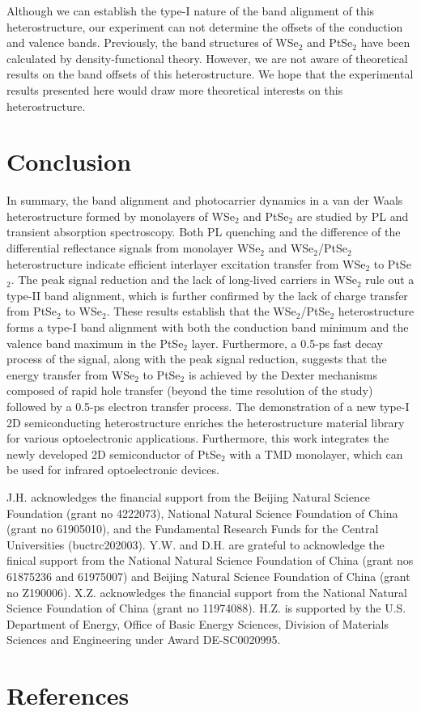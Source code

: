 \documentclass[10pt]{iopart}
\begin{document}
Although we can establish the type-I nature of the band alignment of this heterostructure, our experiment can not determine the offsets of the conduction and valence bands. Previously, the band structures of WSe$_2$ and PtSe$_2$ have been calculated by density-functional theory\cite{wang2015monolayer,zhao2017high,sattar2017electronic,li2016tuning,kim2021thickness}. However, we are not aware of theoretical results on the band offsets of this heterostructure. We hope that the experimental results presented here would draw more theoretical interests on this heterostructure.


 \section{Conclusion} 
 In summary, the band alignment and photocarrier dynamics in a van der Waals heterostructure formed by monolayers of WSe$_2$ and PtSe$_2$ are studied by PL and transient absorption spectroscopy. Both PL quenching and the difference of the differential reflectance signals from monolayer WSe$_2$ and WSe$_2$/PtSe$_2$ heterostructure indicate efficient interlayer excitation transfer from WSe$_2$ to PtSe$_2$. The peak signal reduction and the lack of long-lived carriers in WSe$_2$ rule out a type-II band alignment, which is further confirmed by the lack of charge transfer from PtSe$_2$ to WSe$_2$. These results establish that the WSe$_2$/PtSe$_2$ heterostructure forms a type-I band alignment with both the conduction band minimum and the valence band maximum in the PtSe$_2$ layer. Furthermore, a 0.5-ps fast decay process of the signal, along with the peak signal reduction, suggests that the energy transfer from WSe$_2$ to PtSe$_2$ is achieved by the Dexter mechanisms composed of rapid hole transfer (beyond the time resolution of the study) followed by a 0.5-ps electron transfer process. The demonstration of a new type-I 2D semiconducting heterostructure enriches the heterostructure material library for various optoelectronic applications. Furthermore, this work integrates the newly developed 2D semiconductor of PtSe$_2$ with a TMD monolayer, which can be used for infrared optoelectronic devices.
 
 \ack
 J.H. acknowledges the financial support from the Beijing Natural Science Foundation (grant no 4222073), National Natural Science Foundation of China (grant no 61905010), and the Fundamental Research Funds for the Central Universities (buctrc202003). Y.W. and D.H. are grateful to acknowledge the finical support from the National Natural Science Foundation of China (grant nos 61875236 and 61975007) and Beijing Natural Science Foundation of China (grant no Z190006). X.Z. acknowledges the financial support from the National Natural Science Foundation of China (grant no 11974088). H.Z. is supported by the U.S. Department of Energy, Office of Basic Energy Sciences, Division of Materials Sciences and Engineering under Award DE-SC0020995.
 \section*{References} 


\end{document}
